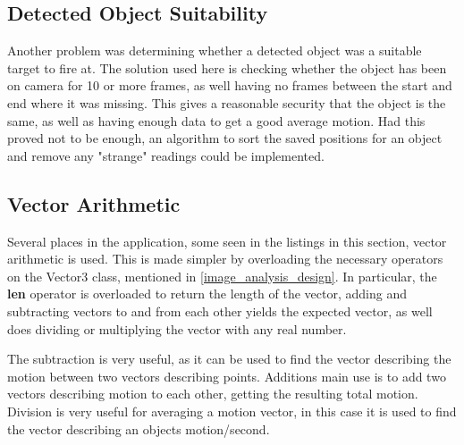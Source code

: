 

\subsection{Detected Object Suitability}

Another problem was determining whether a detected object was a suitable target to fire at. The solution used here is
checking whether the object has been on camera for 10 or more frames, as well having no frames between the start and
end where it was missing. This gives a reasonable security that the object is the same, as well as having enough data
to get a good average motion. Had this proved not to be enough, an algorithm to sort the saved positions for an object
and remove any "strange" readings could be implemented.

\subsection{Vector Arithmetic}
Several places in the application, some seen in the listings in this section, vector arithmetic is used. This is
made simpler by overloading the necessary operators on the Vector3 class, mentioned in \autoref{image_analysis_design}.
In particular, the \textbf{len} operator is overloaded to return the length of the vector, 
adding and subtracting vectors to and from each other yields the expected vector, as well does dividing or multiplying
the vector with any real number.

The subtraction is very useful, as it can be used to find the vector describing the motion between two vectors describing
points. Additions main use is to add two vectors describing motion to each other, getting the resulting total motion.
Division is very useful for averaging a motion vector, in this case it is used to find the vector describing an objects
motion/second.
